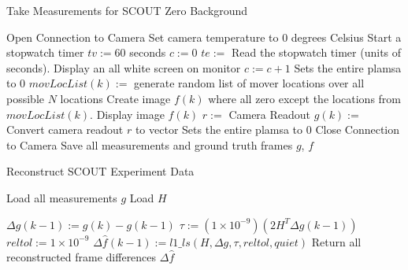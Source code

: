 \begin{algorithm}
	\caption{Take Measurements for SCOUT Zero Background}
	\begin{algorithmic}[1]
		\State Open Connection to Camera
		\State Set camera temperature to $0$ degrees Celsius
		\State Start a stopwatch timer
		\State $tv := 60$ seconds
		\State $c := 0$
			\Begin
			\State $te := $ Read the stopwatch timer (units of seconds).
				\Begin
					\State Display an all white screen on monitor
					\State $c := c + 1$
				\End
			\State Sets the entire plamsa to $0$
			\State $movLocList(k) := $ generate random list of mover locations over all possible $N$ locations
			\State Create image $f(k)$ where all zero except the locations from $movLocList(k)$. 
			\State Display image $f(k)$ 
			\State $r :=$ Camera Readout
			\State $g(k) := $ Convert camera readout $r$ to vector 
			\State Sets the entire plamsa to $0$
			\End
		\State Close Connection to Camera
		\State Save all measurements and ground truth frames $g$, $f$
\end{algorithmic}
\end{algorithm}

\begin{algorithm}
	\caption{Reconstruct SCOUT Experiment Data}
	\begin{algorithmic}[1]
		\State Load all measurements $g$
		\State Load $H$ 
		
			\Begin
			\State $\Delta g(k - 1) := g(k) - g(k-1)$ 
			\State $\tau := (1 \times 10^{-9}) \left( 2 H^T \Delta g(k-1) \right)$
			\State $ reltol := 1 \times 10 ^ {-9} $
			\State $\Delta \hat{f}(k-1) := l1\_ls(H, \Delta g, \tau, reltol, quiet)$ 
			\End
		\State Return all reconstructed frame differences $\Delta \hat{f}$
\end{algorithmic}
\end{algorithm}
